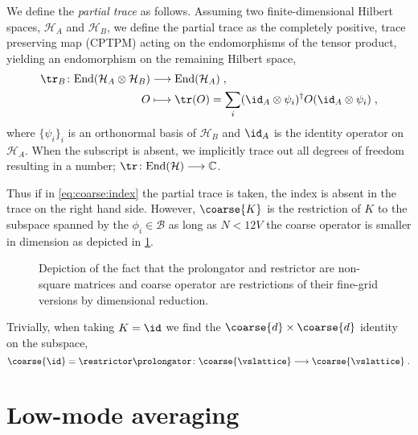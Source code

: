 We define the \emph{partial trace} as follows.
Assuming two finite-dimensional Hilbert spaces, $\mathcal{H}_A$ and $\mathcal{H}_B$, we define the partial trace as the completely positive, trace preserving map (CPTPM) acting on the endomorphisms of the tensor product, yielding an endomorphism on the remaining Hilbert space,
\begin{align} \label{eq:partial:trace}
\begin{aligned}
\tr_B \colon \text{End}(\mathcal{H}_A \otimes \mathcal{H}_B) &\longrightarrow \text{End}(\mathcal{H}_A) \;, \\
O &\longmapsto \tr(O) = \sum_{i} ( \id_A \otimes \psi_i )^{\dagger} O ( \id_A \otimes \psi_i ) \;,
\end{aligned}
\end{align}
where $\{\psi_i\}_i$ is an orthonormal basis of $\mathcal{H}_B$ and $\id_A$ is the identity operator on $\mathcal{H}_A$.
When the subscript is absent, we implicitly trace out all degrees of freedom resulting in a number; $\tr \colon \text{End}(\mathcal{H}) \longrightarrow \mathbb{C}$.

Thus if in \cref{eq:coarse:index} the partial trace is taken, the index is absent in the trace on the right hand side.
However, $\coarse{K}$ is the restriction of $K$ to the subspace spanned by the $\phi_{i} \in \mathcal{B}$ as long as $N < 12V$ the coarse operator is smaller in dimension as depicted in \cref{fig:coarsen}.
\begin{figure}
  
  \caption{Depiction of the fact that the prolongator and restrictor are non-square matrices and coarse operator are restrictions of their fine-grid versions by dimensional reduction.}
  \label{fig:coarsen}
\end{figure}
Trivially, when taking $K = \id$ we find the $\coarse{d} \times \coarse{d}$ identity on the subspace,
\begin{equation}
\coarse{\id} = \restrictor \prolongator \colon \coarse{\vslattice} \longrightarrow \coarse{\vslattice} \;.
\end{equation}

\section{Low-mode averaging}
\label{sec:sd:lma}

